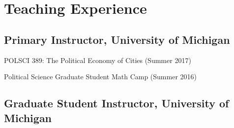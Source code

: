 \documentclass[letterpaper]{article}
\renewenvironment{itemize}{
  \begin{list}{}{
    \setlength{\leftmargin}{1.5em}
  }
}{
  \end{list}
}
\begin{document}
\hrulefill

\section*{Teaching Experience}

\subsection*{Primary Instructor, University of Michigan}
\begin{itemize}
\item POLSCI 389: The Political Economy of Cities  (Summer 2017)
\item Political Science Graduate Student Math Camp (Summer 2016)
\end{itemize}

\subsection*{Graduate Student Instructor, University of Michigan}
\end{document}
